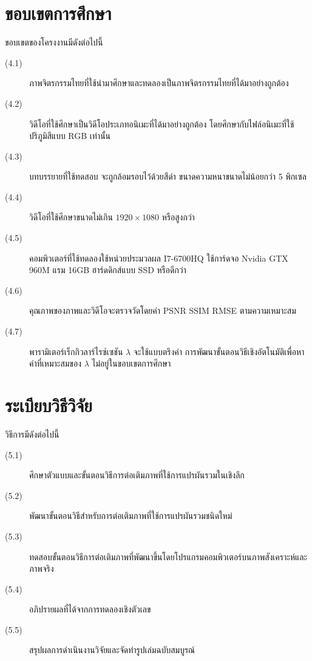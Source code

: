 \documentclass[hidelinks,a4paper]{article}
\numberwithin{equation}{section}							%
\begin{document}
{\section{ขอบเขตการศึกษา}
\hspace{1cm} ขอบเขตของโครงงานมีดังต่อไปนี้
\begin{description}
	\item[(4.1)] ภาพจิตรกรรมไทยที่ใช้นำมาศึกษาและทดลองเป็นภาพจิตรกรรมไทยที่ได้มาอย่างถูกต้อง
	\item[(4.2)] วิดีโอที่ใช้ศึกษาเป็นวิดีโอประเภทอนิเมะที่ได้มาอย่างถูกต้อง โดยศึกษากับไฟล์อนิเมะที่ใช้ปริภูมิสีแบบ RGB เท่านั้น
	\item[(4.3)] บทบรรยายที่ใช้ทดสอบ จะถูกล้อมรอบไว้ด้วยสีดำ ขนาดความหนาขนาดไม่น้อยกว่า 5 พิกเซล
	\item[(4.4)] วิดีโอที่ใช้ศึกษาขนาดไม่เกิน $1920\times1080$ หรือสูงกว่า
	\item[(4.5)] คอมพิวเตอร์ที่ใช้ทดลองใช้หน่วยประมวลผล I7-6700HQ ใช้การ์ดจอ Nvidia GTX 960M แรม 16GB ฮาร์ดดิกส์แบบ SSD หรือดีกว่า
	\item[(4.6)] คุณภาพของภาพและวิดีโอจะตรวจวัดโดยค่า PSNR SSIM RMSE ตามความเหมาะสม
	\item[(4.7)] พารามิเตอร์เร็กกิวลาร์ไรซ์เซชัน $\lambda$ จะใช้แบบตรึงค่า การพัฒนาขั้นตอนวิธีเชิงอัตโนมัติเพื่อหาค่าที่เหมาะสมของ $\lambda$ ไม่อยู่ในขอบเขตการศึกษา
\end{description}

\section{ระเบียบวิธีวิจัย}
\hspace{1cm} วิธีการมีดังต่อไปนี้
\begin{description}
	\item[(5.1)] ศึกษาตัวแบบและขั้นตอนวิธีการต่อเติมภาพที่ใช้การแปรผันรวมในเชิงลึก
	\item[(5.2)] พัฒนาขั้นตอนวิธีสำหรับการต่อเติมภาพที่ใช้การแปรผันรวมชนิดใหม่
	\item[(5.3)] ทดสอบขั้นตอนวิธีการต่อเติมภาพที่พัฒนาขึ้นโดยโปรแกรมคอมพิวเตอร์บนภาพสังเคราะห์และภาพจริง
	\item[(5.4)] อภิปรายผลที่ได้จากการทดลองเชิงตัวเลข
	\item[(5.5)] สรุปผลการดำเนินงานวิจัยและจัดทำรูปเล่มฉบับสมบูรณ์
\end{description}

}
\end{document}
